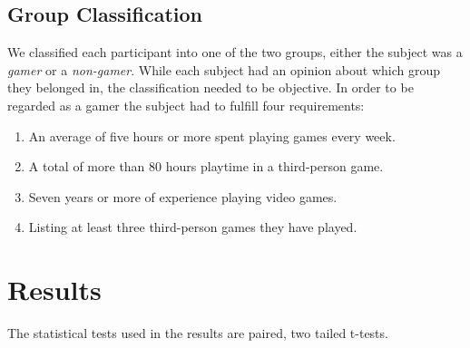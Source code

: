 \documentclass[runningheads,a4paper,oribibl]{llncs}
\begin{document}
\subsection{Group Classification} \label{subsec:GroupClassification}
We classified each participant into one of the two groups, either the subject was a \emph{gamer} or a \emph{non-gamer}. While each subject had an opinion about which group they belonged in, the classification needed to be objective. In order to be regarded as a gamer the subject had to fulfill four requirements:
\begin{enumerate}
   \item An average of five hours or more spent playing games every week. 
   \item A total of more than 80 hours playtime in a third-person game.
   \item Seven years or more of experience playing video games.
   \item Listing at least three third-person games they have played.
\end{enumerate}


%





















\section{Results}
The statistical tests used in the results are paired, two tailed t-tests.

\end{document}
